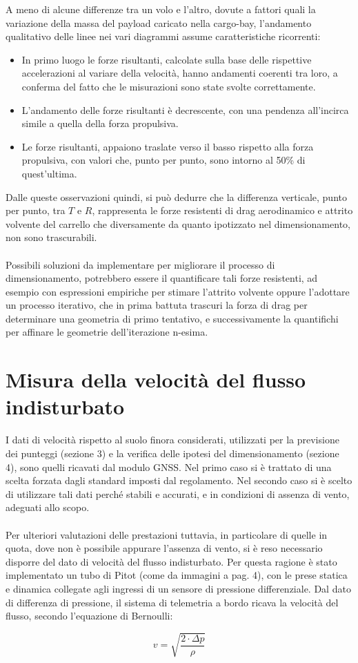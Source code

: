 \documentclass[12pt]{article}
\begin{document}
\noindent
A meno di alcune differenze tra un volo e l'altro, dovute a fattori quali la variazione della massa del payload caricato nella cargo-bay, l'andamento qualitativo delle linee nei vari diagrammi assume caratteristiche ricorrenti:
\begin{itemize}
\item In primo luogo le forze risultanti, calcolate sulla base delle rispettive accelerazioni al variare della velocità, hanno andamenti coerenti tra loro, a conferma del fatto che le misurazioni sono state svolte correttamente.
\item L'andamento delle forze risultanti è decrescente, con una pendenza all'incirca simile a quella della forza propulsiva.
\item Le forze risultanti, appaiono traslate verso il basso rispetto alla forza propulsiva, con valori che, punto per punto, sono intorno al 50\% di quest'ultima.
\end{itemize}
Dalle queste osservazioni quindi, si può dedurre che la differenza verticale, punto per punto, tra $T$ e $R$, rappresenta le forze resistenti di drag aerodinamico e attrito volvente del carrello che diversamente da quanto ipotizzato nel dimensionamento, non sono trascurabili.
\\\\
Possibili soluzioni da implementare per migliorare il processo di dimensionamento, potrebbero essere il quantificare tali forze resistenti, ad esempio con espressioni empiriche per stimare l'attrito volvente oppure l'adottare un processo iterativo, che in prima battuta trascuri la forza di drag per determinare una geometria di primo tentativo, e successivamente la quantifichi per affinare le geometrie dell'iterazione n-esima.

\section{Misura della velocità del flusso indisturbato}
I dati di velocità rispetto al suolo finora considerati, utilizzati per la previsione dei punteggi (sezione 3) e la verifica delle ipotesi del dimensionamento (sezione 4), sono quelli ricavati dal modulo GNSS. Nel primo caso si è trattato di una scelta forzata dagli standard imposti dal regolamento. Nel secondo caso si è scelto di utilizzare tali dati perché stabili e accurati, e in condizioni di assenza di vento, adeguati allo scopo.
\\\\
Per ulteriori valutazioni delle prestazioni tuttavia, in particolare di quelle in quota, dove non è possibile appurare l'assenza di vento, si è reso necessario disporre del dato di velocità del flusso indisturbato. Per questa ragione è stato implementato un tubo di Pitot (come da immagini a pag. 4), con le prese statica e dinamica collegate agli ingressi di un sensore di pressione differenziale. Dal dato di differenza di pressione, il sistema di telemetria a bordo ricava la velocità del flusso, secondo l'equazione di Bernoulli:

\begin{equation}
v = \sqrt{\frac{2 \cdot \Delta p}{\rho}}
\end{equation}



\newpage


\end{document}
